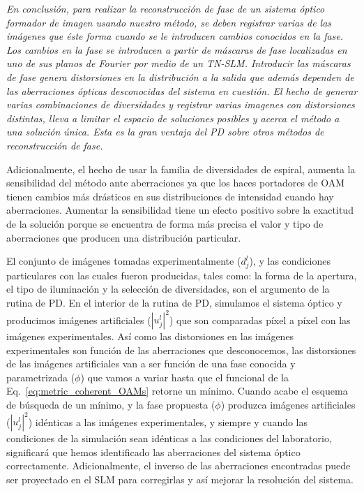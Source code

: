\emph{En conclusión, para realizar la reconstrucción de fase de un sistema
óptico formador de imagen usando nuestro método, se deben registrar varias de las
imágenes que éste forma cuando se le introducen cambios conocidos en
la fase. Los cambios en la fase se introducen a partir de máscaras de
fase localizadas en uno de sus planos de Fourier por medio de un
TN-SLM.  
Introducir las máscaras de fase genera distorsiones en la distribución
a la salida que además dependen de las aberraciones ópticas desconocidas del
sistema en cuestión. El hecho de generar varias combinaciones de
diversidades y registrar varias imagenes con distorsiones distintas,
lleva a limitar el espacio de soluciones posibles y acerca el método a
una solución única. Esta es la gran ventaja del PD sobre otros métodos
de reconstrucción de fase.}


Adicionalmente, el hecho de usar la familia
de diversidades de espiral, aumenta la sensibilidad del método ante
aberraciones ya que los haces portadores de OAM tienen cambios más
drásticos en sus distribuciones de intensidad cuando hay
aberraciones. Aumentar la sensibilidad tiene un efecto positivo sobre
la exactitud de la solución porque se encuentra de forma más precisa
el valor y tipo de aberraciones que producen una distribución particular. 

El conjunto de imágenes tomadas experimentalmente ($d_j^l$), y las
condiciones particulares con las cuales fueron producidas, tales como:
la forma de la apertura, el tipo de iluminación y la selección de diversidades, son el
argumento de la rutina de PD. En el interior de la rutina de PD,
simulamos el sistema óptico y producimos imágenes artificiales
($|u_j^l|^2$) que son comparadas píxel a píxel con las imágenes
experimentales. Así como las distorsiones en las imágenes
experimentales son función de las aberraciones que desconocemos, las
distorsiones de las imágenes artificiales van a ser función de una
fase conocida y parametrizada ($\phi$) que vamos a variar hasta que el
funcional de la Eq.~\ref{eq:metric_coherent_OAMs} retorne un mínimo. 
Cuando acabe el esquema de búsqueda de un mínimo, y la fase
propuesta ($\phi$) produzca imágenes artificiales ($|u_j^l|^2$)
idénticas a las imágenes experimentales, y siempre y cuando las
condiciones de la simulación sean idénticas a las condiciones del
laboratorio, significará que hemos identificado las aberraciones del
sistema óptico correctamente. Adicionalmente, el inverso de las aberraciones
encontradas puede ser proyectado en el SLM para corregirlas y así mejorar la resolución
del sistema.

